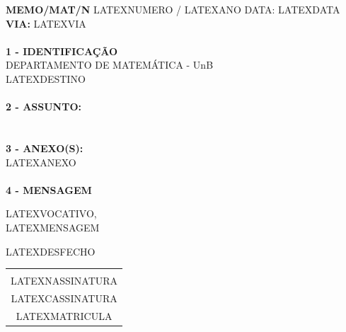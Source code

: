 \documentclass[12pt]{artigo_novo}
\begin{document}
\vspace*{.8cm}
\timbrado
\setlength{\baselineskip}{5mm}
\noindent 
\begin{minipage}{16cm}
\vspace*{-8mm}
\parindent=1.2cm
\setlength{\baselineskip}{5mm}
\vspace*{.2cm}
\noindent
\small
{\bf  MEMO/MAT/N\primo} LATEXNUMERO / LATEXANO \hfill {DATA:} {LATEXDATA}
\vum \\
{\bf VIA:} {LATEXVIA}  
\\
\mbox{} \hrulefill\
\\
{\bf 1 - IDENTIFICA\c{C}\~AO} 
\\
\phantom{xxx}{\bf Proced\^encia:} {DEPARTAMENTO DE MATEM\'ATICA - UnB}
\\
 {LATEXDESTINO}
\\
\mbox{} \hrulefill\
\\
{\bf 2 - ASSUNTO:} \\
\phantom{xxx}{LATEXASSUNTO}
\\
\mbox{} \hrulefill\
\\
{\bf 3 - ANEXO(S):} 
\\
\phantom{xxx} {LATEXANEXO}
\\
\mbox{} \hrulefill\
\\
{ \bf 4 - MENSAGEM} 
\end{minipage}
\setlength{\baselineskip}{5mm}
\vspace*{.92cm} 

LATEXVOCATIVO,
\vspace*{8mm} \\
\noindent 
LATEXMENSAGEM 
\vspace*{8mm} 
\hspace*{8cm} 
\setlength{\baselineskip}{5mm}
\vspace*{10mm} 

LATEXDESFECHO
\vspace*{15mm} \\
\begin{center} 
\begin{tabular}{c}
\hline \vspace*{-3mm}\\
LATEXNASSINATURA \\
{\small LATEXCASSINATURA}\\
{\small LATEXMATRICULA}
%
\end{tabular} 
\end{center}
\end{document}
